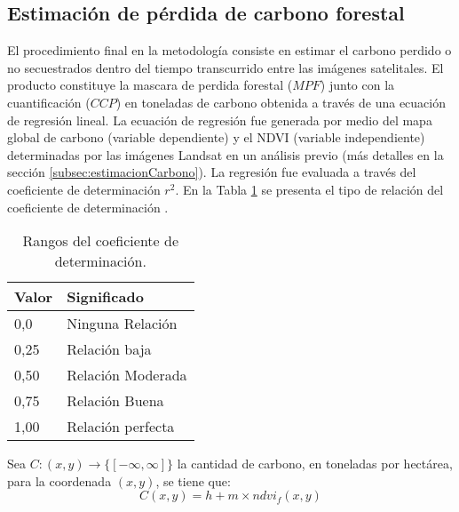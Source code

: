 \subsection{Estimaci\'on de p\'erdida de carbono forestal}
El procedimiento final en la metodolog\'ia consiste en estimar el carbono perdido o no secuestrados dentro del tiempo transcurrido entre las im\'agenes satelitales. El producto constituye la mascara de perdida forestal ($ MPF $) junto con la cuantificaci\'on ($ CCP $) en toneladas de carbono obtenida a trav\'es de una ecuaci\'on de regresi\'on lineal. La ecuaci\'on de regresi\'on fue generada por medio del mapa global de carbono (variable dependiente) \cite{saatchi2011benchmark} y el NDVI (variable independiente) determinadas por las im\'agenes Landsat en un an\'alisis previo (m\'as detalles en la secci\'on \ref{subsec:estimacionCarbono}). La regresi\'on fue evaluada a trav\'es del coeficiente de determinaci\'on $ r^{2} $. En la Tabla \ref{t:coefDeter} se presenta el tipo de relaci\'on del coeficiente de determinaci\'on \cite{kris2014estimacionCorr}.
\begin{table}[H]
	\centering
	\begin{tabular}{|l|l|}
		\hline
		\textbf{Valor} & \textbf{Significado} \\ \hline
		0,0            & Ninguna Relaci\'on     \\ \hline
		0,25           & Relaci\'on baja        \\ \hline
		0,50           & Relaci\'on Moderada    \\ \hline
		0,75           & Relaci\'on Buena       \\ \hline
		1,00           & Relaci\'on perfecta    \\ \hline
	\end{tabular}
	\caption{Rangos del coeficiente de determinaci\'on.}
	\label{t:coefDeter}
\end{table}

Sea $ C:(x,y) \longrightarrow \{ [-\infty,\infty]\}$ la cantidad de carbono, en toneladas por hect\'area, para la coordenada $ (x,y) $, se tiene que: 
\begin{equation}\label{ec:regreLinelCarb}
C(x,y)=h+m \times ndvi_{f}(x,y)
\end{equation}

